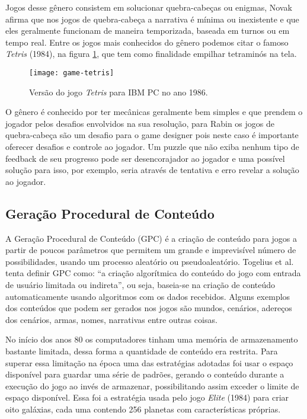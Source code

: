 \documentclass[10pt, conference, compsocconf]{IEEEtran}
\begin{document}
Jogos desse gênero consistem em solucionar quebra-cabeças ou enigmas, Novak \parencite{novak2010gamedev} afirma que nos jogos de quebra-cabeça a narrativa é mínima ou inexistente e que eles geralmente funcionam de maneira temporizada, baseada em turnos ou em tempo real. Entre os jogos mais conhecidos do gênero podemos citar o famoso \textit{Tetris} (1984), na figura \ref{fig:game-tetris}, que tem como finalidade empilhar tetraminós na tela.

\begin{figure}[ht]
    \centering
    \texttt{[image: game-tetris]}
    \caption{Versão do jogo \textit{Tetris} para IBM PC no ano 1986.}
    \label{fig:game-tetris}
\end{figure}

O gênero é conhecido por ter mecânicas geralmente bem simples e que prendem o jogador pelos desafios envolvidos na sua resolução, para Rabin \parencite{rabin2011intro1} os jogos de quebra-cabeça são um desafio para o game designer pois neste caso é importante oferecer desafios e controle ao jogador. Um puzzle que não exiba nenhum tipo de feedback de seu progresso pode ser desencorajador ao jogador e uma possível solução para isso, por exemplo, seria através de tentativa e erro revelar a solução ao jogador.

\subsection{Geração Procedural de Conteúdo}

A Geração Procedural de Conteúdo (GPC) é a criação de conteúdo para jogos a partir de poucos parâmetros que permitem um grande e imprevisível número de possibilidades, usando um processo aleatório ou pseudoaleatório. Togelius et al. \parencite{togelius2011pcgames} tenta definir GPC como: “a criação algorítmica do conteúdo do jogo com entrada de usuário limitada ou indireta”, ou seja, baseia-se na criação de conteúdo automaticamente usando algoritmos com os dados recebidos. Alguns exemplos dos conteúdos que podem ser gerados nos jogos são mundos, cenários, adereços dos cenários, armas, nomes, narrativas entre outras coisas.

No início dos anos 80 os computadores tinham uma memória de armazenamento bastante limitada, dessa forma a quantidade de conteúdo era restrita. Para superar essa limitação na época uma das estratégias adotadas foi usar o espaço disponível para guardar uma série de padrões, gerando o conteúdo durante a execução do jogo ao invés de armazenar, possibilitando assim exceder o limite de espaço disponível. Essa foi a estratégia usada pelo jogo \textit{Elite} (1984) para criar oito galáxias, cada uma contendo 256 planetas com características próprias.
\end{document}

